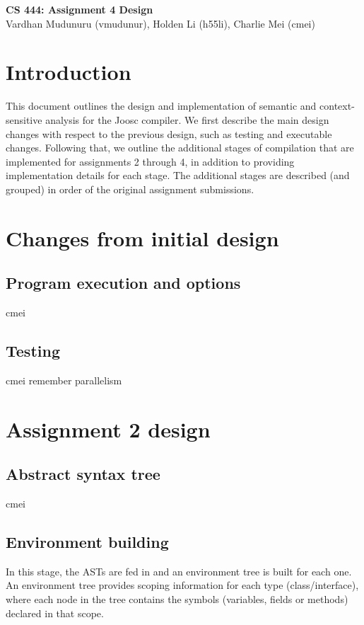 \documentclass[12pt]{article}
\begin{document}
\begin{center}
  \textbf{\Large{CS 444: Assignment 4 Design}} \\
  \vspace{5pt}
  Vardhan Mudunuru (vmudunur), Holden Li (h55li), Charlie Mei (cmei) \\
\end{center}
\vspace{5pt}

\section*{Introduction}

This document outlines the design and implementation of semantic and
context-sensitive analysis for the Joosc compiler. We first describe the main
design changes with respect to the previous design, such as testing and
executable changes. Following that, we outline the additional stages of
compilation that are implemented for assignments 2 through 4, in addition to
providing implementation details for each stage. The additional stages are
described (and grouped) in order of the original assignment submissions.

\section{Changes from initial design}

\subsection{Program execution and options}
cmei

\subsection{Testing}
cmei
remember parallelism

\section{Assignment 2 design}

\subsection{Abstract syntax tree}
cmei

\subsection{Environment building}
In this stage, the ASTs are fed in and an environment tree is built for each
one.  An environment tree provides scoping information for each type
(class/interface), where each node in the tree contains the
symbols (variables, fields or methods)
declared in that scope.
\end{document}
